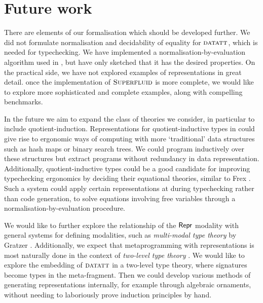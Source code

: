 
\section{Future work}


There are elements of our formalisation which should be developed further. We
did not formulate normalisation and decidability of equality for ${\textsc{datatt}}$,
which is needed for typechecking. We have implemented a
normalisation-by-evaluation algorithm used in \superfluid, but have only
sketched that it has the desired properties. On the practical side, we have not
explored examples of representations in great detail. once the implementation of
$\textsc{Superfluid}$ is more complete, we would like to explore more sophisticated and
complete examples, along with compelling benchmarks.

In the future we aim to expand the class of theories we consider, in particular
to include quotient-induction. Representations for quotient-inductive types in
could give rise to ergonomic ways of computing with more `traditional' data
structures such as hash maps or binary search trees. We could program
inductively over these structures but extract programs without redundancy in
data representation. Additionally, quotient-inductive types could be a good
candidate for improving typechecking ergonomics by deciding their equational
theories, similar to Frex \cite{Allais2023-rg}. Such a system could
apply certain representations at during typechecking rather than code generation,
to solve equations involving free variables through a normalisation-by-evaluation  \cite{Altenkirch2020-rm}
procedure.


We would like to further explore the relationship of the $\textsf{Repr}$ modality with
general systems for defining modalities, such as \emph{multi-modal type theory}
by Gratzer \cite{Gratzer2020-kf}. Additionally, we expect that metaprogramming with
representations is most naturally done in the context of \emph{two-level type theory}
\cite{Kovacs2022-vb}. We would like to explore the embedding of ${\textsc{datatt}}$
in a two-level type theory, where signatures become types in the meta-fragment.
Then we could develop various methods of generating representations internally,
for example through algebraic ornaments, without needing to laboriously prove
induction principles by hand.

